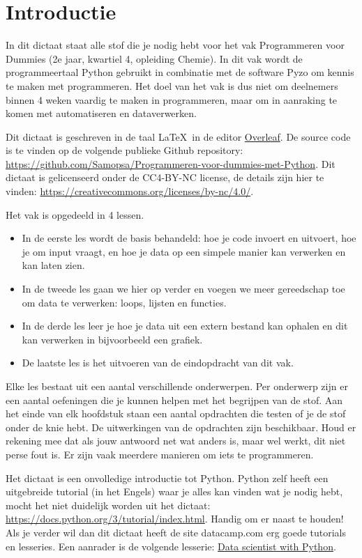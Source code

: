 \chapter*{Introductie}
In dit dictaat staat alle stof die je nodig hebt voor het vak Programmeren voor Dummies (2e jaar, kwartiel 4, opleiding Chemie). In dit vak wordt de programmeertaal Python gebruikt in combinatie met de software Pyzo om kennis te maken met programmeren. Het doel van het vak is dus niet om deelnemers binnen 4 weken vaardig te maken in programmeren, maar om in aanraking te komen met automatiseren en dataverwerken. 

Dit dictaat is geschreven in de taal \LaTeX\ in de editor \href{https://www.overleaf.com}{Overleaf}. De source code is te vinden op de volgende publieke Github repository: \href{https://github.com/Samopsa/Programmeren-voor-dummies-met-Python}{https://github.com/Samopsa/Programmeren-voor-dummies-met-Python}. Dit dictaat is gelicenseerd onder de CC4-BY-NC license, de details zijn hier te vinden: \href{https://creativecommons.org/licenses/by-nc/4.0/}{https://creativecommons.org/licenses/by-nc/4.0/}.

Het vak is opgedeeld in 4 lessen.
\begin{itemize}
\item In de eerste les wordt de basis behandeld: hoe je code invoert en uitvoert, hoe je om input vraagt, en hoe je data op een simpele manier kan verwerken en kan laten zien. 
\item In de tweede les gaan we hier op verder en voegen we meer gereedschap toe om data te verwerken: loops, lijsten en functies. 
\item In de derde les leer je hoe je data uit een extern bestand kan ophalen en dit kan verwerken in bijvoorbeeld een grafiek. 
\item De laatste les is het uitvoeren van de eindopdracht van dit vak. 
\end{itemize}

Elke les bestaat uit een aantal verschillende onderwerpen. Per onderwerp zijn er een aantal oefeningen die je kunnen helpen met het begrijpen van de stof. Aan het einde van elk hoofdstuk staan een aantal opdrachten die testen of je de stof onder de knie hebt. De uitwerkingen van de opdrachten zijn beschikbaar. Houd er rekening mee dat als jouw antwoord net wat anders is, maar wel werkt, dit niet perse fout is. Er zijn vaak meerdere manieren om iets te programmeren.

Het dictaat is een onvolledige introductie tot Python. Python zelf heeft een uitgebreide tutorial (in het Engels) waar je alles kan vinden wat je nodig hebt, mocht het niet duidelijk worden uit het dictaat: \href{https://docs.python.org/3/tutorial/index.html}{https://docs.python.org/3/tutorial/index.html}. Handig om er naast te houden! Als je verder wil dan dit dictaat heeft de site datacamp.com erg goede tutorials en lesseries. Een aanrader is de volgende lesserie:
\href{https://www.datacamp.com/tracks/data-scientist-with-python}{Data scientist with Python}.

